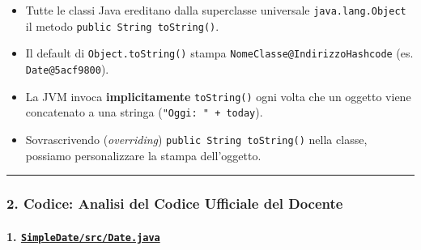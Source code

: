 \documentclass[11pt,a4paper]{article}
\newcommand{\passthrough}[1]{#1}
\providecommand{\tightlist}{\setlength{\itemsep}{0pt}\setlength{\parskip}{0pt}}
\begin{document}
\begin{itemize}
  \begin{itemize}
  \tightlist
  \item
    Tutte le classi Java ereditano dalla superclasse universale
    \passthrough{\lstinline!java.lang.Object!} il metodo
    \passthrough{\lstinline!public String toString()!}.
  \item
    Il default di \passthrough{\lstinline!Object.toString()!} stampa
    \passthrough{\lstinline!NomeClasse@IndirizzoHashcode!} (es.
    \passthrough{\lstinline!Date@5acf9800!}).
  \item
    La JVM invoca \textbf{implicitamente}
    \passthrough{\lstinline!toString()!} ogni volta che un oggetto viene
    concatenato a una stringa
    (\passthrough{\lstinline!"Oggi: " + today!}).
  \item
    Sovrascrivendo (\emph{overriding})
    \passthrough{\lstinline!public String toString()!} nella classe,
    possiamo personalizzare la stampa dell'oggetto.
  \end{itemize}
\end{itemize}

\begin{center}\rule{0.5\linewidth}{0.5pt}\end{center}

\subsubsection{2. Codice: Analisi del Codice Ufficiale del
Docente}\label{codice-analisi-del-codice-ufficiale-del-docente}

\paragraph{\texorpdfstring{1.
\href{file:///home/wally/Documenti/GitHub/Programmazione-II/25-26/Teoria-e-Esercitazioni/Codice-20260902/Lezioni05-06/SimpleDate/src/Date.java}{\texttt{SimpleDate/src/Date.java}}}{1. SimpleDate/src/Date.java}}\label{simpledatesrcdate.java}
\end{document}
